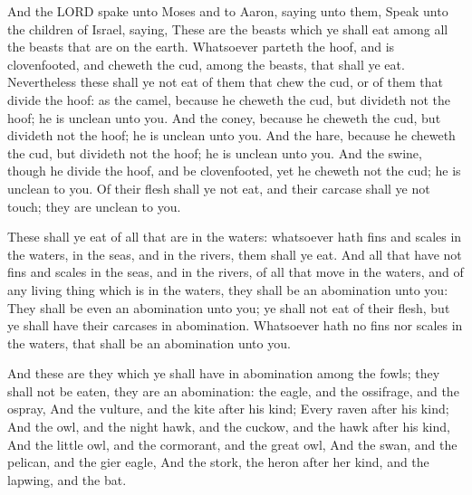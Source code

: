  And the LORD spake unto Moses and to Aaron, saying unto
them,  Speak unto the children of Israel, saying, These are
the beasts which ye shall eat among all the beasts that are on the
earth.  Whatsoever parteth the hoof, and is clovenfooted,
and cheweth the cud, among the beasts, that shall ye eat. 
Nevertheless these shall ye not eat of them that chew the cud, or of
them that divide the hoof: as the camel, because he cheweth the cud, but
divideth not the hoof; he is unclean unto you.  And the
coney, because he cheweth the cud, but divideth not the hoof; he is
unclean unto you.  And the hare, because he cheweth the cud,
but divideth not the hoof; he is unclean unto you.  And the
swine, though he divide the hoof, and be clovenfooted, yet he cheweth
not the cud; he is unclean to you.  Of their flesh shall ye
not eat, and their carcase shall ye not touch; they are unclean to you.

 These shall ye eat of all that are in the waters:
whatsoever hath fins and scales in the waters, in the seas, and in the
rivers, them shall ye eat.  And all that have not fins and
scales in the seas, and in the rivers, of all that move in the waters,
and of any living thing which is in the waters, they shall be an
abomination unto you:  They shall be even an abomination
unto you; ye shall not eat of their flesh, but ye shall have their
carcases in abomination.  Whatsoever hath no fins nor
scales in the waters, that shall be an abomination unto you.

 And these are they which ye shall have in abomination
among the fowls; they shall not be eaten, they are an abomination: the
eagle, and the ossifrage, and the ospray,  And the vulture,
and the kite after his kind;  Every raven after his kind;
 And the owl, and the night hawk, and the cuckow, and the
hawk after his kind,  And the little owl, and the
cormorant, and the great owl,  And the swan, and the
pelican, and the gier eagle,  And the stork, the heron
after her kind, and the lapwing, and the bat.

